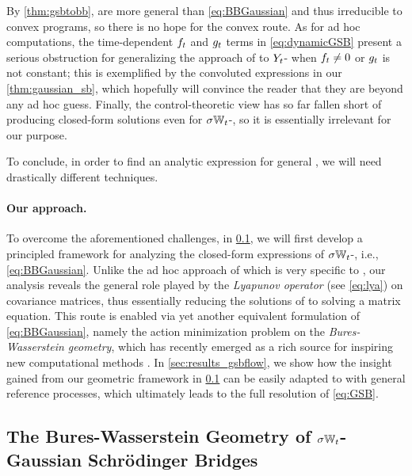 By \cref{thm:gsbtobb},  are more general than \eqref{eq:BBGaussian} and thus irreducible to convex programs, so there is no hope for the convex route. As for ad hoc computations, the time-dependent $\driftf$ and $\volat[\ctime]$ terms in \eqref{eq:dynamicGSB} present a serious obstruction for generalizing the approach of \citet{mallasto2021entropy} to $\refsde$- when $\driftf \neq 0$ or $\volat[\ctime]$ is not constant; this is exemplified by the convoluted expressions in our \cref{thm:gaussian_sb}, which hopefully will convince the reader that they are beyond any ad hoc guess. Finally, the control-theoretic view has so far fallen short of producing closed-form solutions even for $\sigma\Wiener$-, so it is essentially irrelevant for our purpose. 

To conclude, in order to find an analytic expression for general , we will need drastically different techniques.

\paragraph{Our approach.}

To overcome the aforementioned challenges, in \cref{sec:mechanics_gsbflow}, we will first develop a principled framework for analyzing the closed-form expressions of $\sigma\Wiener$-, i.e., \eqref{eq:BBGaussian}. Unlike the ad hoc approach of \citet{mallasto2021entropy} which is very specific to , our analysis reveals the general role played by the \emph{Lyapunov operator} (see \eqref{eq:lya}) on covariance matrices, thus essentially reducing the solutions of  to solving a matrix equation. This route is enabled via yet another equivalent formulation of \eqref{eq:BBGaussian}, namely the action minimization problem on the \emph{Bures-Wasserstein geometry}, which has recently emerged as a rich source for inspiring new computational methods \citep{chewi2020gradient, altschuler2021averaging, han2021riemannian}. In \cref{sec:results_gsbflow}, we show how the insight gained from our geometric framework in \cref{sec:mechanics_gsbflow} can be easily adapted to  with general reference processes, which ultimately leads to the full resolution of \eqref{eq:GSB}.

\subsection{The Bures-Wasserstein Geometry of $\sigma\Wiener$-Gaussian Schr\"odinger Bridges}
\label{sec:mechanics_gsbflow}

